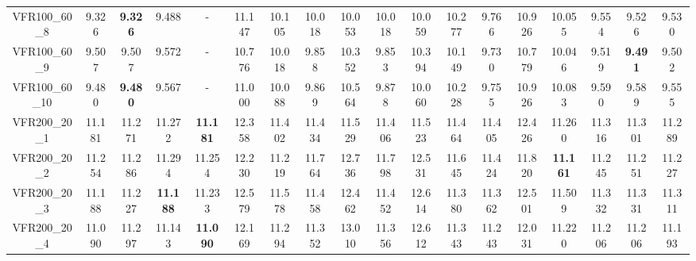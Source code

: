 \begin{tabular}{cc|ccc|ccccccccccccc}
VFR100\_60\_8      & 9.326            & {\bf 9.326}      & 9.488            & -                & 11.147           & 10.105           & 10.018           & 10.053           & 10.018           & 10.059           & 10.277           & 9.766            & 10.926           & 10.055           & 9.554            & 9.526            & 9.530           \\ 
VFR100\_60\_9      & 9.507            & 9.507            & 9.572            & -                & 10.776           & 10.018           & 9.858            & 10.352           & 9.853            & 10.394           & 10.149           & 9.730            & 10.779           & 10.046           & 9.519            & {\bf 9.491}      & 9.502           \\ 
VFR100\_60\_10     & 9.480            & {\bf 9.480}      & 9.567            & -                & 11.000           & 10.088           & 9.869            & 10.564           & 9.878            & 10.060           & 10.228           & 9.755            & 10.926           & 10.083           & 9.590            & 9.589            & 9.555           \\ 
VFR200\_20\_1      & 11.181           & 11.271           & 11.272           & {\bf 11.181}     & 12.358           & 11.402           & 11.434           & 11.529           & 11.406           & 11.523           & 11.464           & 11.405           & 12.426           & 11.260           & 11.316           & 11.301           & 11.289          \\ 
VFR200\_20\_2      & 11.254           & 11.286           & 11.294           & 11.254           & 12.230           & 11.219           & 11.764           & 12.736           & 11.798           & 12.531           & 11.645           & 11.424           & 11.820           & {\bf 11.161}     & 11.245           & 11.251           & 11.227          \\ 
VFR200\_20\_3      & 11.188           & 11.227           & {\bf 11.188}     & 11.233           & 12.579           & 11.578           & 11.458           & 12.462           & 11.452           & 12.614           & 11.380           & 11.362           & 12.501           & 11.509           & 11.332           & 11.331           & 11.311          \\ 
VFR200\_20\_4      & 11.090           & 11.297           & 11.143           & {\bf 11.090}     & 12.169           & 11.294           & 11.352           & 13.010           & 11.356           & 12.612           & 11.343           & 11.243           & 12.031           & 11.220           & 11.206           & 11.206           & 11.193          \\ 

\end{tabular}
